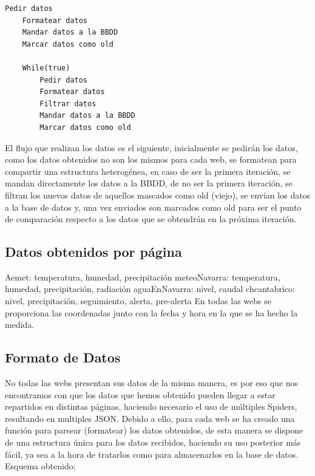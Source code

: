 \begin{lstlisting}[caption={Flujo de datos}]
	Pedir datos
	Formatear datos
	Mandar datos a la BBDD
	Marcar datos como old
	
	While(true)
		Pedir datos
		Formatear datos
		Filtrar datos
		Mandar datos a la BBDD
		Marcar datos como old
\end{lstlisting}

El flujo que realizan los datos es el siguiente, inicialmente se pedirán los datos, como los datos obtenidos no son los mismos para cada web, se formatean para compartir una estructura heterogénea, en caso de ser la primera iteración, se mandan directamente los datos a la BBDD, de no ser la primera iteración, se filtran los nuevos datos de aquellos mascados como old (viejo), se envían los datos a la base de datos y, una vez enviados son marcados como old para ser el punto de comparación respecto a los datos que se obtendrán en la próxima iteración.

\subsection{Datos obtenidos por página}
Aemet:\newline
temperatura, humedad, precipitación
\newline\newline
meteoNavarra:\newline
temperatura, humedad, precipitación, radiación
\newline\newline
aguaEnNavarra:\newline
nivel, caudal
\newline\newline
chcantabrico:\newline
nivel, precipitación, seguimiento, alerta, pre-alerta
\newline\newline
En todas las webs se proporciona las coordenadas junto con la fecha y hora en la que se ha hecho la medida.

\subsection{Formato de Datos}
No todas las webs presentan sus datos de la misma manera, es por eso que nos encontramos con que los datos que hemos obtenido pueden llegar a estar repartidos en distintas páginas, haciendo necesario el uso de múltiples Spiders, resultando en multiples JSON.\newline
\newline
Debido a ello, para cada web se ha creado una función para parsear (formatear) los datos obtenidos, de esta manera se dispone de una estructura única para los datos recibidos, haciendo su uso posterior más fácil, ya sea a la hora de tratarlos como para almacenarlos en la base de datos.\newline
\newline
Esquema obtenido:

